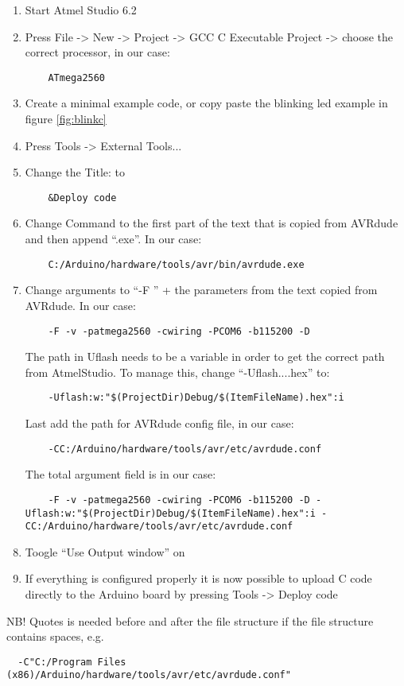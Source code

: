 \begin{enumerate}
    \item Start Atmel Studio 6.2
    \item Press File -> New -> Project -> GCC C Executable Project -> choose the correct processor, in our case:
    \begin{lstlisting}
    ATmega2560
    \end{lstlisting}
    \item Create a minimal example code, or copy paste the blinking led example in figure \ref{fig:blinkc}
    \item Press Tools -> External Tools...
    \item Change the Title: to 
    \begin{lstlisting}
    &Deploy code
    \end{lstlisting}
    \item Change Command to the first part of the text that is copied from AVRdude and then append ``.exe''. In our case:
    \begin{lstlisting}
    C:/Arduino/hardware/tools/avr/bin/avrdude.exe
    \end{lstlisting}
    \item Change arguments to ``-F '' + the parameters from the text copied from AVRdude. In our case:
    \begin{lstlisting}
    -F -v -patmega2560 -cwiring -PCOM6 -b115200 -D 
    \end{lstlisting}
    The path in Uflash needs to be a variable in order to get the correct path from AtmelStudio. To manage this, change ``-Uflash....hex'' to:
    \begin{lstlisting}
    -Uflash:w:"$(ProjectDir)Debug/$(ItemFileName).hex":i
    \end{lstlisting}
    Last add the path for AVRdude config file, in our case:
    \begin{lstlisting}
    -CC:/Arduino/hardware/tools/avr/etc/avrdude.conf
    \end{lstlisting}
    
    
    The total argument field is in our case:
    \begin{lstlisting}
    -F -v -patmega2560 -cwiring -PCOM6 -b115200 -D -Uflash:w:"$(ProjectDir)Debug/$(ItemFileName).hex":i -CC:/Arduino/hardware/tools/avr/etc/avrdude.conf
    \end{lstlisting}
    
    \item Toogle ``Use Output window'' on
    \item If everything is configured properly it is now possible to upload C code directly to the Arduino board by pressing Tools -> Deploy code
\end{enumerate}
NB! Quotes is needed before and after the file structure if the file structure contains spaces, e.g.
\begin{lstlisting}
  -C"C:/Program Files (x86)/Arduino/hardware/tools/avr/etc/avrdude.conf"
\end{lstlisting}


